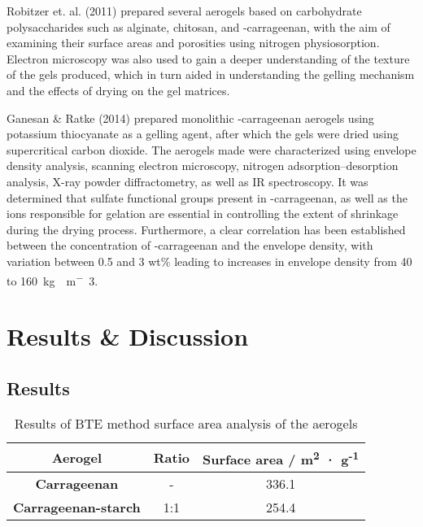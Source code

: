 \documentclass[a4paper,12pt]{article}
\begin{document}
Robitzer et. al. (2011) prepared several aerogels based on carbohydrate polysaccharides such as alginate, chitosan, and \textkappa-carrageenan, with the aim of examining their surface areas and porosities using nitrogen physiosorption. Electron microscopy was also used to gain a deeper understanding of the texture of the gels produced, which in turn aided in understanding the gelling mechanism and the effects of drying on the gel matrices.\supercite{robitzer_nitrogen_2011}

Ganesan \& Ratke (2014) prepared monolithic \textkappa-carrageenan aerogels using potassium thiocyanate as a gelling agent, after which the gels were dried using supercritical carbon dioxide. The aerogels made were characterized using envelope density analysis, scanning electron microscopy, nitrogen adsorption–desorption analysis, X-ray powder diffractometry, as well as IR spectroscopy. It was determined that sulfate functional groups present in \textkappa-carrageenan, as well as the ions responsible for gelation are essential in controlling the extent of shrinkage during the drying process. Furthermore, a clear correlation has been established between the concentration of \textkappa-carrageenan and the envelope density, with variation between 0.5 and 3 wt\% leading to increases in envelope density from 40 to \SI{160}{kg\cdot m^-3}.\supercite{ganesan_facile_2014}

\pagebreak

\section{Results \& Discussion}

\subsection{Results}

\begin{table}[H]
\centering
\caption{Results of BTE method surface area analysis of the aerogels}
\label{tab3}
\begin{tabular}{@{}ccc@{}}
\toprule
\textbf{Aerogel} & \textbf{Ratio} & \textbf{Surface area / m\textsuperscript{2} · g\textsuperscript{-1}} \\ \midrule
\textbf{Carrageenan} & - & 336.1 \\
\textbf{Carrageenan-starch} & 1:1 & 254.4 \\ \bottomrule
\end{tabular}
\end{table}
\end{document}
